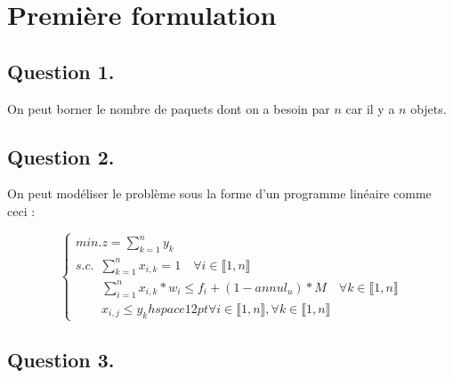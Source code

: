 \section{Première formulation}\label{sec:1_form}

\subsection*{Question 1.}

On peut borner le nombre de paquets dont on a besoin par $n$ car il y a $n$ objets.\vspace{12pt}


\subsection*{Question 2.}

On peut modéliser le problème sous la forme d'un programme linéaire comme ceci :\vspace{12pt}

\begin{equation}
    \begin{cases}
        min. z = \sum_{k = 1}^{n} y_k\\
        s.c. \hspace{6pt}\sum_{k = 1}^{n} x_{i, k} = 1 \hspace{12pt} \forall i \in \llbracket  1, n \rrbracket\\
        \hspace{25pt}\sum_{i = 1}^{n} x_{i, k}*w_i \leq f_i + (1 - annul_u)*M \hspace{12pt} \forall k \in \llbracket  1, n \rrbracket\\
        \hspace{25pt}x_{i, j} \leq y_k hspace{12pt} \forall i \in \llbracket  1, n \rrbracket, \forall k  \in \llbracket  1, n \rrbracket
    \end{cases}
\end{equation}


\subsection*{Question 3.}

